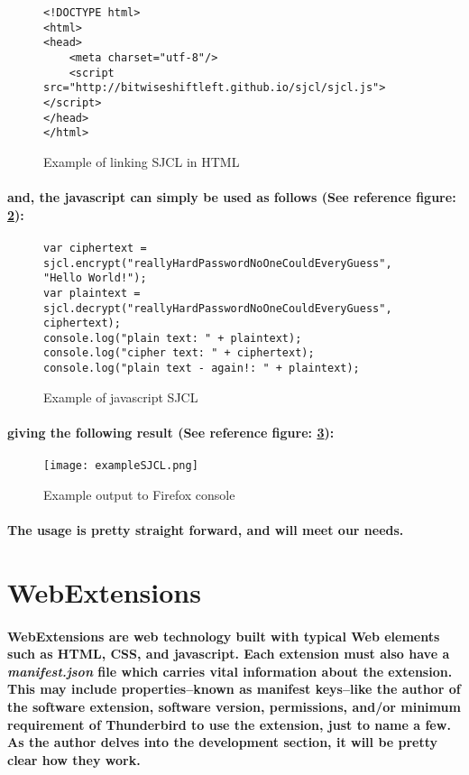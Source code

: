\begin{figure}[H]
\begin{verbatim}
<!DOCTYPE html>
<html>
<head>
    <meta charset="utf-8"/>
    <script src="http://bitwiseshiftleft.github.io/sjcl/sjcl.js"></script>
</head>
</html>
\end{verbatim}
\caption{\label{fig: exampleSJCL_html} Example of linking SJCL in HTML}
\end{figure}

\paragraph{and, the javascript can simply be used as follows (See reference figure: \ref{fig: exampleSJCL_js}):}

\begin{figure}[H]
\centering
\begin{verbatim}
var ciphertext = sjcl.encrypt("reallyHardPasswordNoOneCouldEveryGuess", "Hello World!");
var plaintext = sjcl.decrypt("reallyHardPasswordNoOneCouldEveryGuess", ciphertext);
console.log("plain text: " + plaintext);
console.log("cipher text: " + ciphertext);
console.log("plain text - again!: " + plaintext);
\end{verbatim}
\caption{\label{fig: exampleSJCL_js} Example of javascript SJCL}
\end{figure}

\paragraph{giving the following result (See reference figure: \ref{fig: exampleSJCL}):}

\begin{figure}[H]
\centering
\texttt{[image: exampleSJCL.png]}
\caption{\label{fig: exampleSJCL} Example output to Firefox console}
\end{figure}

\paragraph{The usage is pretty straight forward, and will meet our needs.}

\section{WebExtensions}

\paragraph{WebExtensions are web technology built with typical Web elements such as HTML, CSS, and javascript. Each extension must also have a \emph{manifest.json} file which carries vital information about the extension. This may include properties--known as manifest keys--like the author of the software extension, software version, permissions, and/or minimum requirement of Thunderbird to use the extension, just to name a few. As the author delves into the development section, it will be pretty clear how they work.} \cite[Webpage]{WebEx}

